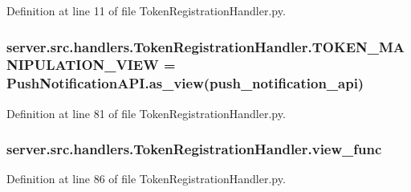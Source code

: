 Definition at line 11 of file Token\+Registration\+Handler.\+py.

\subsubsection[{\texorpdfstring{T\+O\+K\+E\+N\+\_\+\+M\+A\+N\+I\+P\+U\+L\+A\+T\+I\+O\+N\+\_\+\+V\+I\+EW}{TOKEN_MANIPULATION_VIEW}}]{\setlength{\rightskip}{0pt plus 5cm}server.\+src.\+handlers.\+Token\+Registration\+Handler.\+T\+O\+K\+E\+N\+\_\+\+M\+A\+N\+I\+P\+U\+L\+A\+T\+I\+O\+N\+\_\+\+V\+I\+EW = Push\+Notification\+A\+P\+I.\+as\+\_\+view(\textquotesingle{}push\+\_\+notification\+\_\+api\textquotesingle{})}\hypertarget{namespaceserver_1_1src_1_1handlers_1_1_token_registration_handler_aabeef39baf790dc67ea58a6d0389536b}{}\label{namespaceserver_1_1src_1_1handlers_1_1_token_registration_handler_aabeef39baf790dc67ea58a6d0389536b}


Definition at line 81 of file Token\+Registration\+Handler.\+py.

\subsubsection[{\texorpdfstring{view\+\_\+func}{view_func}}]{\setlength{\rightskip}{0pt plus 5cm}server.\+src.\+handlers.\+Token\+Registration\+Handler.\+view\+\_\+func}\hypertarget{namespaceserver_1_1src_1_1handlers_1_1_token_registration_handler_ad59b4d5f87e37fc111e8f3207cfcd42e}{}\label{namespaceserver_1_1src_1_1handlers_1_1_token_registration_handler_ad59b4d5f87e37fc111e8f3207cfcd42e}


Definition at line 86 of file Token\+Registration\+Handler.\+py.

